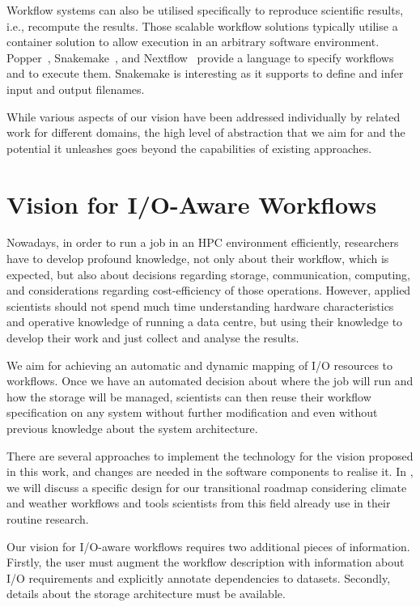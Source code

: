 \documentclass{superfri}
\begin{document}
Workflow systems can also be utilised specifically to reproduce scientific results, i.e., recompute the results.
Those scalable workflow solutions typically utilise a container solution to allow execution in an arbitrary software environment.
Popper~\cite{jimenez2017popper}, Snakemake~\cite{bts480}, and Nextflow~\cite{Nextflow} provide a language to specify workflows and to execute them.
Snakemake is interesting as it supports to define and infer input and output filenames.

While various aspects of our vision have been addressed individually by related work for different domains, the high level of abstraction that we aim for and the potential it unleashes goes beyond the capabilities of existing approaches.

\section{Vision for I/O-Aware Workflows}
\label{sec:vision}

Nowadays, in order to run a job in an HPC environment efficiently, researchers have to develop profound knowledge, not only about their workflow, which is expected, but also about decisions regarding storage, communication, computing, and considerations regarding cost-efficiency of those operations.
However, applied scientists should not spend much time understanding hardware characteristics and operative knowledge of running a data centre, but using their knowledge to develop their work and just collect and analyse the results.

We aim for achieving an automatic and dynamic mapping of I/O resources to workflows.
Once we have an automated decision about where the job will run and how the storage will be managed, scientists can then reuse their workflow specification on any system without further modification and even without previous knowledge about the system architecture.

There are several approaches to implement the technology for the vision proposed in this work, and changes are needed in the software components to realise it.
In , we will discuss a specific design for our transitional roadmap considering climate and weather workflows and tools scientists from this field already use in their routine research.

Our vision for I/O-aware workflows requires two additional pieces of information.
Firstly, the user must augment the workflow description with information about I/O requirements and explicitly annotate dependencies to datasets.
Secondly, details about the storage architecture must be available.
\end{document}
